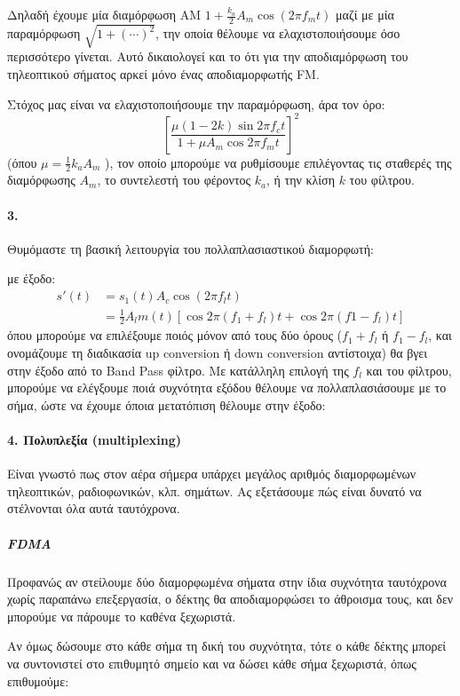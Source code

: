 \documentclass[11pt,a4paper,notitlepage,fleqn]{article}
\begin{document}
Δηλαδή έχουμε μία διαμόρφωση AM \( 1+\frac{k_a}{2}A_m\cos(2πf_m t) \) μαζί με μία
παραμόρφωση \( \sqrt{1+(\cdots)^2} \), την οποία θέλουμε να ελαχιστοποιήσουμε όσο
περισσότερο γίνεται. Αυτό δικαιολογεί και το ότι για την αποδιαμόρφωση του τηλεοπτικού
σήματος αρκεί μόνο ένας αποδιαμορφωτής FM.

Στόχος μας είναι να ελαχιστοποιήσουμε την παραμόρφωση, άρα τον όρο:
\[
\left[\frac{μ(1-2k)\sin2πf_ct}{1+μA_m\cos2πf_mt}\right]^2
\]
(όπου \( μ = \frac{1}{2}k_aA_m \) ), τον οποίο μπορούμε να ρυθμίσουμε επιλέγοντας τις
σταθερές της διαμόρφωσης \( A_m \), το συντελεστή του φέροντος \( k_a \), ή την κλίση \( k \)
του φίλτρου.

\paragraph{3.}
Θυμόμαστε τη βασική λειτουργία του πολλαπλασιαστικού διαμορφωτή:

με έξοδο:
\begin{align*}
	s'(t) &= s_1(t)A_c\cos(2πf_l t) \\
	&= \frac{1}{2}A_l m(t) \left[
	\cos2π(f_1+f_l)t + \cos 2π(f1-f_l)t
	\right]
\end{align*}
όπου μπορούμε να επιλέξουμε ποιός μόνον από τους δύο όρους (\( f_1+f_l \) ή \( f_1-f_l \), και
ονομάζουμε τη διαδικασία up conversion ή down conversion αντίστοιχα) θα βγει στην έξοδο
από το Band Pass φίλτρο. Με κατάλληλη επιλογή της \( f_l \) και του φίλτρου, μπορούμε να
ελέγξουμε ποιά συχνότητα εξόδου θέλουμε να πολλαπλασιάσουμε με το σήμα, ώστε να έχουμε
όποια μετατόπιση θέλουμε στην έξοδο:

\paragraph{4. Πολυπλεξία (multiplexing)}
Είναι γνωστό πως στον αέρα σήμερα υπάρχει μεγάλος αριθμός διαμορφωμένων τηλεοπτικών,
ραδιοφωνικών, κλπ. σημάτων. Ας εξετάσουμε πώς είναι δυνατό να στέλνονται όλα αυτά ταυτόχρονα.

\subparagraph{FDMA}

Προφανώς αν στείλουμε δύο διαμορφωμένα σήματα στην ίδια συχνότητα ταυτόχρονα χωρίς παραπάνω
επεξεργασία, ο δέκτης θα αποδιαμορφώσει το άθροισμα τους, και δεν μπορούμε να
πάρουμε το καθένα ξεχωριστά.

Αν όμως δώσουμε στο κάθε σήμα τη δική του συχνότητα, τότε ο κάθε δέκτης μπορεί να
συντονιστεί στο επιθυμητό σημείο και να δώσει κάθε σήμα ξεχωριστά, όπως επιθυμούμε:
\end{document}
